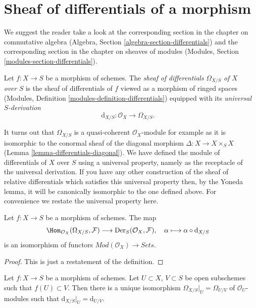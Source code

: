 \section{Sheaf of differentials of a morphism}
\label{section-sheaf-differentials}

\noindent
We suggest the reader take a look at the corresponding section
in the chapter on commutative algebra
(Algebra, Section \ref{algebra-section-differentials})
and the corresponding section in the chapter on sheaves of modules
(Modules, Section \ref{modules-section-differentials}).

\begin{definition}
\label{definition-sheaf-differentials}
Let $f : X \to S$ be a morphism of schemes.
The {\it sheaf of differentials $\Omega_{X/S}$ of $X$ over $S$} is
the sheaf of differentials of $f$ viewed as a morphism of ringed spaces
(Modules, Definition \ref{modules-definition-differentials})
equipped with its {\it universal $S$-derivation}
$$
\text{d}_{X/S} : \mathcal{O}_X \longrightarrow \Omega_{X/S}.
$$
\end{definition}

\noindent
It turns out that $\Omega_{X/S}$ is a quasi-coherent $\mathcal{O}_X$-module
for example as it is isomorphic to the conormal sheaf
of the diagonal morphism $\Delta : X \to X \times_S X$
(Lemma \ref{lemma-differentials-diagonal}).
We have defined the module of differentials of $X$ over $S$ using a
universal property, namely as the receptacle of the universal derivation.
If you have any other construction of the sheaf of relative differentials
which satisfies this universal property then, by the Yoneda lemma,
it will be canonically isomorphic to the one defined above. For convenience
we restate the universal property here.

\begin{lemma}
\label{lemma-universal-derivation-universal}
Let $f : X \to S$ be a morphism of schemes. The map
$$
\Hom_{\mathcal{O}_X}(\Omega_{X/S}, \mathcal{F})
\longrightarrow
\text{Der}_S(\mathcal{O}_X, \mathcal{F}),\quad
\alpha \longmapsto \alpha \circ \text{d}_{X/S}
$$
is an isomorphism of functors $\textit{Mod}(\mathcal{O}_X) \to \textit{Sets}$.
\end{lemma}

\begin{proof}
This is just a restatement of the definition.
\end{proof}

\begin{lemma}
\label{lemma-differentials-restrict-open}
Let $f : X \to S$ be a morphism of schemes.
Let $U \subset X$, $V \subset S$ be open subschemes such
that $f(U) \subset V$. Then there is a unique isomorphism
$\Omega_{X/S}|_U = \Omega_{U/V}$ of $\mathcal{O}_U$-modules such that
$\text{d}_{X/S}|_U = \text{d}_{U/V}$.
\end{lemma}

